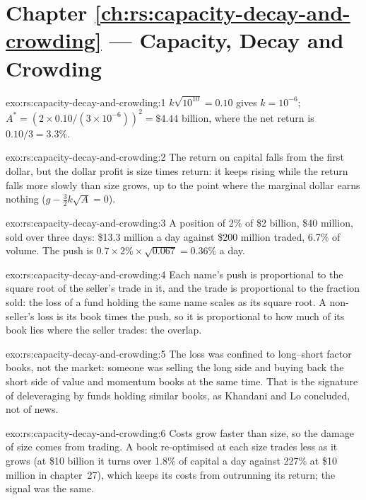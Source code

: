 \section*{Chapter \ref{ch:rs:capacity-decay-and-crowding} --- Capacity, Decay and Crowding}

\begin{solution}{exo:rs:capacity-decay-and-crowding:1}
$k\sqrt{10^{10}} = 0.10$ gives $k = 10^{-6}$; $A^* = (2 \times 0.10/(3 \times 10^{-6}))^2 = \$4.44$ billion, where the net return is $0.10/3 = 3.3\%$.
\end{solution}

\begin{solution}{exo:rs:capacity-decay-and-crowding:2}
The return on capital falls from the first dollar, but the dollar profit is size times return: it keeps rising while the return falls more slowly than size
grows, up to the point where the marginal dollar earns nothing ($g - \frac32 k\sqrt A = 0$).
\end{solution}

\begin{solution}{exo:rs:capacity-decay-and-crowding:3}
A position of 2\% of \$2 billion, \$40 million, sold over three days: \$13.3 million a day against \$200 million traded, 6.7\% of volume. The push is
$0.7 \times 2\% \times \sqrt{0.067} = 0.36\%$ a day.
\end{solution}

\begin{solution}{exo:rs:capacity-decay-and-crowding:4}
Each name's push is proportional to the square root of the seller's trade in it, and the trade is proportional to the fraction sold: the loss of a fund holding
the same name scales as its square root. A non-seller's loss is its book times the push, so it is proportional to how much of its book lies where the seller
trades: the overlap.
\end{solution}

\begin{solution}{exo:rs:capacity-decay-and-crowding:5}
The loss was confined to long--short factor books, not the market: someone was selling the long side and buying back the short side of value and momentum books
at the same time. That is the signature of deleveraging by funds holding similar books, as Khandani and Lo concluded, not of news.
\end{solution}

\begin{solution}{exo:rs:capacity-decay-and-crowding:6}
Costs grow faster than size, so the damage of size comes from trading. A book re-optimised at each size trades less as it grows (at \$10 billion it turns over 1.8\% of
capital a day against 227\% at \$10 million in chapter~27), which keeps its costs from outrunning its return; the signal was the same.
\end{solution}

